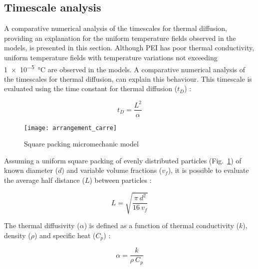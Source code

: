 \FloatBarrier
\subsection{Timescale analysis}
\label{sec:timeconstant}

A comparative numerical analysis of the timescales for thermal diffusion, providing an explanation for the uniform temperature fields observed in the models, is presented in this section. 
Although PEI has poor thermal conductivity, uniform temperature fields with temperature variations not exceeding \SI{1e-5}{\celsius} are observed in the models. 
A comparative numerical analysis of the timescales for thermal diffusion, can explain this behaviour. 
This timescale is evaluated using the time constant for thermal diffusion ($t_D$) : 

\begin{equation}
t_D = \frac{L^2}{\alpha}
\label{equa:time_constant}
\end{equation}

\begin{figure}[htb]
	\center
	\captionsetup{width=35mm}
	\texttt{[image: arrangement\_carre]}
	\caption{Square packing micromechanic model \cite{Brassard2018_figshare_article1}}
	\label{fig:square_packing}
\end{figure}

Assuming a uniform square packing of evenly distributed particles (Fig.~\ref{fig:square_packing}) of known diameter ($d$) and variable volume fractions ($v_f$), it is possible to evaluate the average half distance ($L$) between particles :

\begin{equation}
L = \sqrt{\frac{\pi \ d^2}{16 \ v_f}}
\label{equa:L_average}
\end{equation}

The thermal diffusivity ($\alpha$) is defined as a function of thermal conductivity ($k$), density ($\rho$) and specific heat ($C_p$) : 

\begin{equation}
\alpha = \frac{k}{\rho \ C_p}
\label{equa:thermal_diffusivity}
\end{equation}

